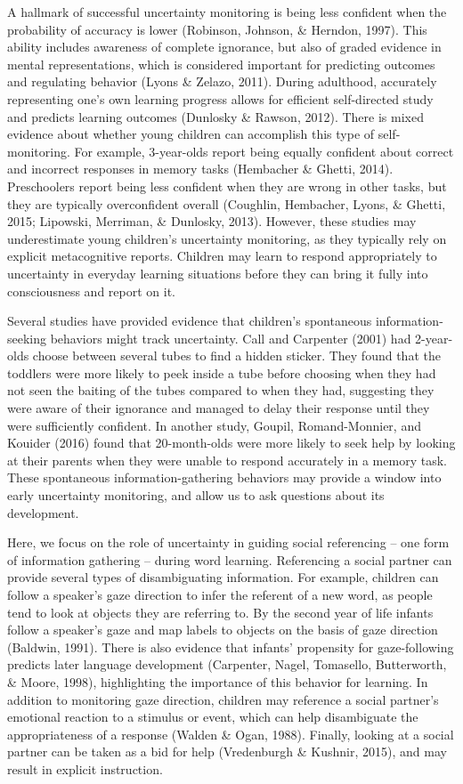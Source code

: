 \documentclass[10pt, letterpaper]{article}
\begin{document}
A hallmark of successful uncertainty monitoring is being less confident
when the probability of accuracy is lower (Robinson, Johnson, \&
Herndon, 1997). This ability includes awareness of complete ignorance,
but also of graded evidence in mental representations, which is
considered important for predicting outcomes and regulating behavior
(Lyons \& Zelazo, 2011). During adulthood, accurately representing one's
own learning progress allows for efficient self-directed study and
predicts learning outcomes (Dunlosky \& Rawson, 2012). There is mixed
evidence about whether young children can accomplish this type of
self-monitoring. For example, 3-year-olds report being equally confident
about correct and incorrect responses in memory tasks (Hembacher \&
Ghetti, 2014). Preschoolers report being less confident when they are
wrong in other tasks, but they are typically overconfident overall
(Coughlin, Hembacher, Lyons, \& Ghetti, 2015; Lipowski, Merriman, \&
Dunlosky, 2013). However, these studies may underestimate young
children's uncertainty monitoring, as they typically rely on explicit
metacognitive reports. Children may learn to respond appropriately to
uncertainty in everyday learning situations before they can bring it
fully into consciousness and report on it.

Several studies have provided evidence that children's spontaneous
information-seeking behaviors might track uncertainty. Call and
Carpenter (2001) had 2-year-olds choose between several tubes to find a
hidden sticker. They found that the toddlers were more likely to peek
inside a tube before choosing when they had not seen the baiting of the
tubes compared to when they had, suggesting they were aware of their
ignorance and managed to delay their response until they were
sufficiently confident. In another study, Goupil, Romand-Monnier, and
Kouider (2016) found that 20-month-olds were more likely to seek help by
looking at their parents when they were unable to respond accurately in
a memory task. These spontaneous information-gathering behaviors may
provide a window into early uncertainty monitoring, and allow us to ask
questions about its development.

Here, we focus on the role of uncertainty in guiding social referencing
-- one form of information gathering -- during word learning.
Referencing a social partner can provide several types of disambiguating
information. For example, children can follow a speaker's gaze direction
to infer the referent of a new word, as people tend to look at objects
they are referring to. By the second year of life infants follow a
speaker's gaze and map labels to objects on the basis of gaze direction
(Baldwin, 1991). There is also evidence that infants' propensity for
gaze-following predicts later language development (Carpenter, Nagel,
Tomasello, Butterworth, \& Moore, 1998), highlighting the importance of
this behavior for learning. In addition to monitoring gaze direction,
children may reference a social partner's emotional reaction to a
stimulus or event, which can help disambiguate the appropriateness of a
response (Walden \& Ogan, 1988). Finally, looking at a social partner
can be taken as a bid for help (Vredenburgh \& Kushnir, 2015), and may
result in explicit instruction.
\end{document}
